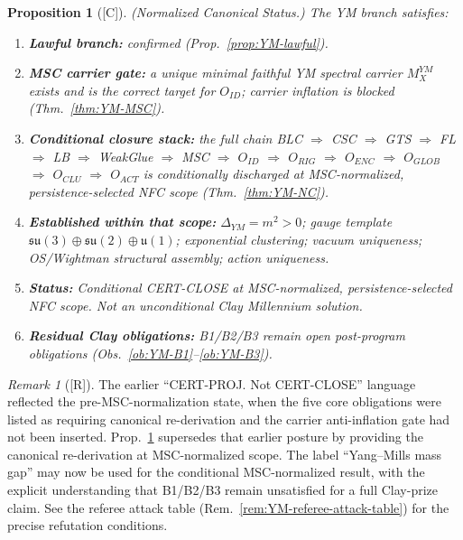\documentclass[12pt,oneside]{amsbook}
\theoremstyle{plain}
\newtheorem{proposition}[theorem]{Proposition}
\theoremstyle{definition}
\theoremstyle{remark}
\newtheorem{remark}[theorem]{Remark}
\newcommand{\status}[1]{\textup{[#1]}}
\begin{document}
\begin{proposition}[\status{C}]\label{prop:YM-status}
\textup{(Normalized Canonical Status.)}
The YM branch satisfies:
\begin{enumerate}[label=\textup{(\arabic*)}]
 \item \textbf{Lawful branch:} confirmed (Prop.~\ref{prop:YM-lawful}).
 \item \textbf{MSC carrier gate:} a unique minimal faithful YM
 spectral carrier $M_X^{YM}$ exists and is the correct
 target for $O_{ID}$; carrier inflation is blocked
 (Thm.~\ref{thm:YM-MSC}).
 \item \textbf{Conditional closure stack:} the full chain
 \textup{BLC} $\Rightarrow$ \textup{CSC} $\Rightarrow$
 \textup{GTS} $\Rightarrow$ \textup{FL} $\Rightarrow$
 \textup{LB} $\Rightarrow$ \textup{WeakGlue} $\Rightarrow$
 \textup{MSC} $\Rightarrow$ $O_{ID}$ $\Rightarrow$ $O_{RIG}$
 $\Rightarrow$ $O_{ENC}$ $\Rightarrow$ $O_{GLOB}$
 $\Rightarrow$ $O_{CLU}$ $\Rightarrow$ $O_{ACT}$ is
 conditionally discharged at MSC-normalized,
 persistence-selected NFC scope
 (Thm.~\ref{thm:YM-NC}).
 \item \textbf{Established within that scope:}
 $\Delta_{YM} = m^2 > 0$; gauge template
 $\mathfrak{su}(3) \oplus \mathfrak{su}(2) \oplus \mathfrak{u}(1)$;
 exponential clustering; vacuum uniqueness; OS/Wightman
 structural assembly; action uniqueness.
 \item \textbf{Status:}
 \emph{Conditional CERT-CLOSE at MSC-normalized,
 persistence-selected NFC scope. Not an unconditional Clay
 Millennium solution.}
 \item \textbf{Residual Clay obligations:} B1/B2/B3 remain open
 post-program obligations
 (Obs.~\ref{ob:YM-B1}--\ref{ob:YM-B3}).
\end{enumerate}
\end{proposition}

\begin{remark}[\status{R}]
The earlier ``CERT-PROJ. Not CERT-CLOSE'' language reflected the
pre-MSC-normalization state, when the five core obligations were
listed as requiring canonical re-derivation and the carrier
anti-inflation gate had not been inserted.
Prop.~\ref{prop:YM-status} supersedes that earlier posture by
providing the canonical re-derivation at MSC-normalized scope.
The label ``Yang--Mills mass gap'' may now be used for the
conditional MSC-normalized result, with the explicit understanding
that B1/B2/B3 remain unsatisfied for a full Clay-prize claim.
See the referee attack table (Rem.~\ref{rem:YM-referee-attack-table})
for the precise refutation conditions.
\end{remark}
\end{document}
